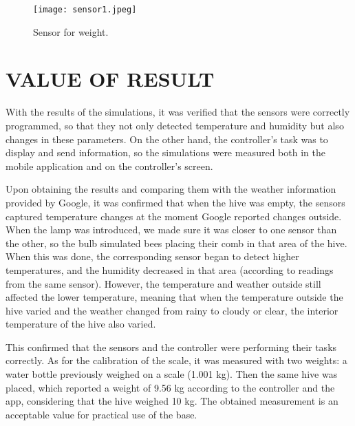 \documentclass[12pt]{report}
\begin{document}
	\begin{figure}
		\centering
		\texttt{[image: sensor1.jpeg]}
		\caption{Sensor for weight.}
		\label{fig:9.3}
	\end{figure}
	
	
	
	\chapter{VALUE OF RESULT}
	With the results of the simulations, it was verified that the sensors were correctly programmed, so that they not only detected temperature and humidity but also changes in these parameters. On the other hand, the controller's task was to display and send information, so the simulations were measured both in the mobile application and on the controller's screen.
	
	\par Upon obtaining the results and comparing them with the weather information provided by Google, it was confirmed that when the hive was empty, the sensors captured temperature changes at the moment Google reported changes outside. When the lamp was introduced, we made sure it was closer to one sensor than the other, so the bulb simulated bees placing their comb in that area of the hive. When this was done, the corresponding sensor began to detect higher temperatures, and the humidity decreased in that area (according to readings from the same sensor). However, the temperature and weather outside still affected the lower temperature, meaning that when the temperature outside the hive varied and the weather changed from rainy to cloudy or clear, the interior temperature of the hive also varied.
	
	\par This confirmed that the sensors and the controller were performing their tasks correctly. As for the calibration of the scale, it was measured with two weights: a water bottle previously weighed on a scale (1.001 kg). Then the same hive was placed, which reported a weight of 9.56 kg according to the controller and the app, considering that the hive weighed 10 kg. The obtained measurement is an acceptable value for practical use of the base.
	
	\pagebreak
\end{document}
